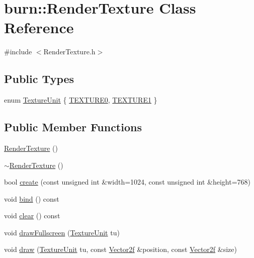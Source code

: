 \hypertarget{classburn_1_1_render_texture}{\section{burn\-:\-:Render\-Texture Class Reference}
\label{classburn_1_1_render_texture}
}


{\ttfamily \#include $<$Render\-Texture.\-h$>$}

\subsection*{Public Types}
\begin{DoxyCompactItemize}
\item 
enum \hyperlink{classburn_1_1_render_texture_a6bab8f7342172061a5bc63c49528f5da}{Texture\-Unit} \{ \hyperlink{classburn_1_1_render_texture_a6bab8f7342172061a5bc63c49528f5daa63857be6a31ec0a5bf5e31ccd90f4530}{T\-E\-X\-T\-U\-R\-E0}, 
\hyperlink{classburn_1_1_render_texture_a6bab8f7342172061a5bc63c49528f5daa7116b76de0e4f6e20d11cc3a540f93d3}{T\-E\-X\-T\-U\-R\-E1}
 \}
\end{DoxyCompactItemize}
\subsection*{Public Member Functions}
\begin{DoxyCompactItemize}
\item 
\hyperlink{classburn_1_1_render_texture_a45a90ff516418ff94aab80a662111bf2}{Render\-Texture} ()
\item 
\hyperlink{classburn_1_1_render_texture_aa4d4ccf9bc258394db5e3c9b17a8240a}{$\sim$\-Render\-Texture} ()
\item 
bool \hyperlink{classburn_1_1_render_texture_aed4d20e1aa9566409e500ab4b84401b6}{create} (const unsigned int \&width=1024, const unsigned int \&height=768)
\item 
void \hyperlink{classburn_1_1_render_texture_a89af1bfdbbc279d24bd734aa765096b4}{bind} () const 
\item 
void \hyperlink{classburn_1_1_render_texture_a3316518369cf057633d22d06a6b1b6bb}{clear} () const 
\item 
void \hyperlink{classburn_1_1_render_texture_aaae0e105c24a1fb2f0d13428f1d8160b}{draw\-Fullscreen} (\hyperlink{classburn_1_1_render_texture_a6bab8f7342172061a5bc63c49528f5da}{Texture\-Unit} tu)
\item 
void \hyperlink{classburn_1_1_render_texture_aa9304d9bf8985071cb73c405ee72aab3}{draw} (\hyperlink{classburn_1_1_render_texture_a6bab8f7342172061a5bc63c49528f5da}{Texture\-Unit} tu, const \hyperlink{namespaceburn_a2af71ec5609a2f2d501827804e86a9b8}{Vector2f} \&position, const \hyperlink{namespaceburn_a2af71ec5609a2f2d501827804e86a9b8}{Vector2f} \&size)
\end{DoxyCompactItemize}


